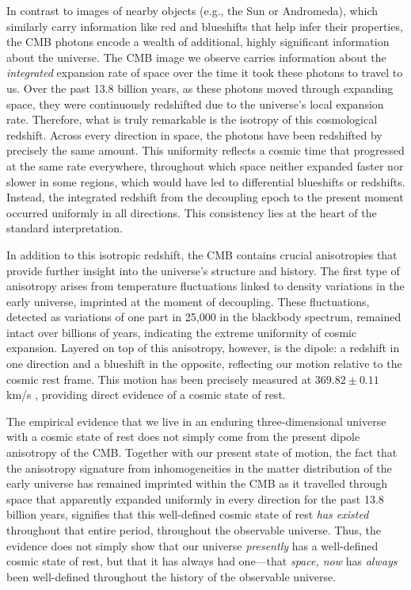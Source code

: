 \documentclass[aps,rmp,groupedaddress,twocolumn,10pt]{revtex4-2}
\begin{document}
In contrast to images of nearby objects (e.g., the Sun or Andromeda), which similarly carry information like red and blueshifts that help infer their properties, the CMB photons encode a wealth of additional, highly significant information about the universe. The CMB image we observe carries information about the \textit{integrated} expansion rate of space over the time it took these photons to travel to us. Over the past 13.8 billion years, as these photons moved through expanding space, they were continuously redshifted due to the universe's local expansion rate. Therefore, what is truly remarkable is the isotropy of this cosmological redshift. Across every direction in space, the photons have been redshifted by precisely the same amount. This uniformity reflects a cosmic time that progressed at the same rate everywhere, throughout which space neither expanded faster nor slower in some regions, which would have led to differential blueshifts or redshifts. Instead, the integrated redshift from the decoupling epoch to the present moment occurred uniformly in all directions. This consistency lies at the heart of the standard interpretation.

In addition to this isotropic redshift, the CMB contains crucial anisotropies that provide further insight into the universe's structure and history. The first type of anisotropy arises from temperature fluctuations linked to density variations in the early universe, imprinted at the moment of decoupling. These fluctuations, detected as variations of one part in 25,000 in the blackbody spectrum, remained intact over billions of years, indicating the extreme uniformity of cosmic expansion. Layered on top of this anisotropy, however, is the dipole: a redshift in one direction and a blueshift in the opposite, reflecting our motion relative to the cosmic rest frame. This motion has been precisely measured at $369.82\pm0.11$ km/s \cite{Aghanim2020a}, providing direct evidence of a cosmic state of rest.

The empirical evidence that we live in an enduring three-dimensional universe with a cosmic state of rest does not simply come from the present dipole anisotropy of the CMB. Together with our present state of motion, the fact that the anisotropy signature from inhomogeneities in the matter distribution of the early universe has remained imprinted within the CMB as it travelled through space that apparently expanded uniformly in every direction for the past 13.8 billion years, signifies that this well-defined cosmic state of rest \textit{has existed} throughout that entire period, throughout the observable universe. Thus, the evidence does not simply show that our universe \textit{presently} has a well-defined cosmic state of rest, but that it has always had one---that \textit{space, now} has \textit{always} been well-defined throughout the history of the observable universe. 
\end{document}
